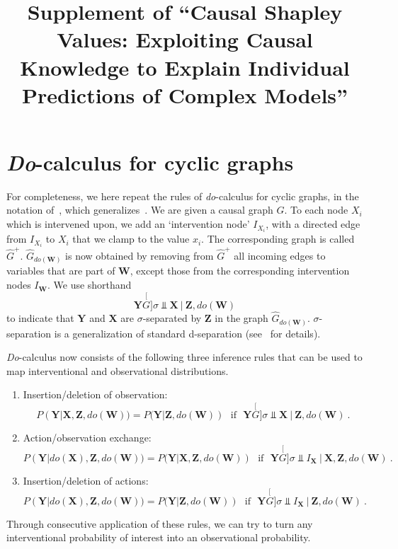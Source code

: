\documentclass{article}
\title{Supplement of ``Causal Shapley Values: Exploiting Causal Knowledge to Explain Individual Predictions of Complex Models''}
\newcommand{\vX}{\mathbf{X}}
\newcommand{\dodo}{\mathit{do}}
\begin{document}
\maketitle

\newcommand{\perpsg}{\stackrel[G]{\sigma}{\Perp}}
\newcommand{\vW}{\mathbf{W}}
\newcommand{\vY}{\mathbf{Y}}
\newcommand{\vZ}{\mathbf{Z}}

\section{\textit{Do}-calculus for cyclic graphs}

For completeness, we here repeat the rules of {\em do}-calculus for cyclic graphs, in the notation of~\cite{forre2019causal}, which generalizes~\cite{pearl2012calculus}. We are given a causal graph $G$. To each node $X_i$ which is intervened upon, we add an `intervention node' $I_{X_i}$, with a directed edge from $I_{X_i}$ to $X_i$ that we clamp to the value $x_i$. The corresponding graph is called $\hat{G}^+$. $\hat{G}_{\dodo(\vW)}$ is now obtained by removing from $\hat{G}^+$ all incoming edges to variables that are part of $\vW$, except those from the corresponding intervention nodes $I_{\vW}$. We use shorthand
\[
\vY \perpsg \vX ~|~ \vZ, \dodo(\mathbf{W})
\]
to indicate that $\vY$ and $\vX$ are $\sigma$-separated by $\vZ$ in the graph $\hat{G}_{\dodo(\vW)}$.  $\sigma$-separation is a generalization of standard d-separation (see~\cite{forre2019causal} for details).

\textit{Do}-calculus now consists of the following three inference rules that can be used to map interventional and observational distributions.
\begin{enumerate}
	\item Insertion/deletion of observation:
	\[
	 P(\vY|\vX,\vZ,\dodo(\vW)) = P(\vY|\vZ,\dodo(\vW)) \mbox{~~if~~} \vY \perpsg \vX ~|~ \vZ,\dodo(\vW) \: .
	\]
	\item Action/observation exchange:
	\[
	P(\vY|\dodo(\vX),\vZ,\dodo(\vW)) = P(\vY|\vX,\vZ,\dodo(\vW)) \mbox{~~if~~} \vY \perpsg I_{\vX} ~|~ \vX, \vZ, \dodo(\vW)  \: .
	\]
	\item Insertion/deletion of actions:
	\[
	P(\vY|\dodo(\vX),\vZ,\dodo(\vW)) = P(\vY|\vZ,\dodo(\vW)) \mbox{~~if~~} \vY \perpsg I_{\vX} ~|~ \vZ,\dodo(\vW) \: .
	\]	
\end{enumerate}
Through consecutive application of these rules, we can try to turn any interventional probability of interest into an observational probability.
\end{document}
